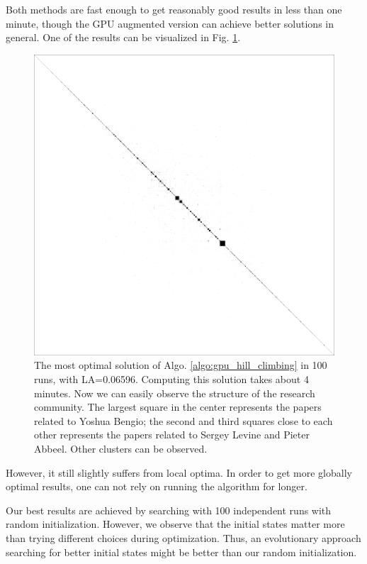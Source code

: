 Both methods are fast enough to get reasonably good results in less than one minute, though the GPU augmented version can achieve better solutions in general.
One of the results can be visualized in Fig. \ref{fig:optimization_results}.

\begin{figure}
    \centering
    \includegraphics[width=\textwidth]{images/seed_94_step_0181.png}
    \caption{The most optimal solution of Algo. \ref{algo:gpu_hill_climbing} in 100 runs, with LA=0.06596.
    Computing this solution takes about 4 minutes.
    Now we can easily observe the structure of the research community.
    The largest square in the center represents the papers related to Yoshua Bengio;
    the second and third squares close to each other represents the papers related to Sergey Levine and Pieter Abbeel.
    Other clusters can be observed.
    }
    \label{fig:optimization_results}
\end{figure}

However, it still slightly suffers from local optima.
In order to get more globally optimal results, one can not rely on running the algorithm for longer.

Our best results are achieved by searching with 100 independent runs with random initialization.
However, we observe that the initial states matter more than trying different choices during optimization.
Thus, an evolutionary approach \cite{eppley2001} searching for better initial states might be better than our random initialization.
